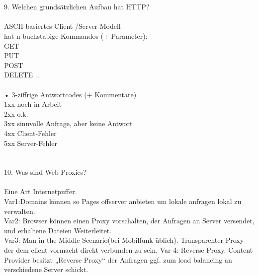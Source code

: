\documentclass{article}
\begin{document}
\\
\\
9. Welchen grundsätzlichen Aufbau hat HTTP?
\\
\\
ASCII-basiertes Client-/Server-Modell\\
hat
n-buchstabige Kommandos (+ Parameter):\\
GET\\
PUT\\
POST\\
DELETE ...\\
\\
• 3-ziffrige Antwortcodes (+ Kommentare)\\
1xx noch in Arbeit\\
2xx o.k.\\
3xx sinnvolle Anfrage, aber keine Antwort\\
4xx Client-Fehler\\
5xx Server-Fehler\\
\\
\\
10. Was sind Web-Proxies?
\\
\\
Eine Art Internetpuffer.\\
Var1:Domains k\"onnen so Pages offserver anbieten um lokale anfragen lokal zu verwalten.\\
Var2: Browser k\"onnen einen Proxy vorschalten, der Anfragen an Server versendet, und erhaltene Dateien Weiterleitet.\\
Var3: Man-in-the-Middle-Scenario(bei Mobilfunk \"ublich). Transparenter Proxy der dem client vormacht direkt verbunden zu sein.
Var 4: Reverse Proxy. Content Provider besitzt „Reverse Proxy“ der Anfragen ggf. zum load balancing an verschiedene Server schickt. 
\end{document}

